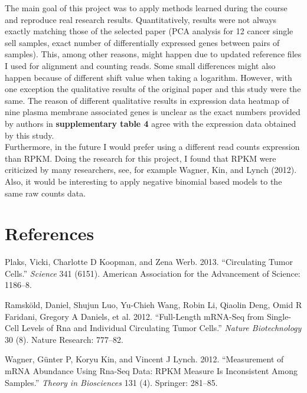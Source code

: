 \documentclass[]{article}
\begin{document}
The main goal of this project was to apply methods learned during the
course and reproduce real research results. Quantitatively, results were
not always exactly matching those of the selected paper (PCA analysis
for 12 cancer single sell samples, exact number of differentially
expressed genes between pairs of samples). This, among other reasons,
might happen due to updated reference files I used for alignment and
counting reads. Some small differences might also happen because of
different shift value when taking a logarithm. However, with one
exception the qualitative results of the original paper and this study
were the same. The reason of different qualitative results in expression
data heatmap of nine plasma membrane associated genes is unclear as the
exact numbers provided by authors in \textbf{supplementary table 4}
agree with the expression data obtained by this study.\\
Furthermore, in the future I would prefer using a different read counts
expression than RPKM. Doing the research for this project, I found that
RPKM were criticized by many researchers, see, for example Wagner, Kin,
and Lynch (2012). Also, it would be interesting to apply negative
binomial based models to the same raw counts data.

\section*{References}\label{references}

\hypertarget{refs}{}
\hypertarget{ref-plaks2013circulating}{}
Plaks, Vicki, Charlotte D Koopman, and Zena Werb. 2013. ``Circulating
Tumor Cells.'' \emph{Science} 341 (6151). American Association for the
Advancement of Science: 1186--8.

\hypertarget{ref-ramskold2012full}{}
Ramsköld, Daniel, Shujun Luo, Yu-Chieh Wang, Robin Li, Qiaolin Deng,
Omid R Faridani, Gregory A Daniels, et al. 2012. ``Full-Length mRNA-Seq
from Single-Cell Levels of Rna and Individual Circulating Tumor Cells.''
\emph{Nature Biotechnology} 30 (8). Nature Research: 777--82.

\hypertarget{ref-wagner2012measurement}{}
Wagner, Günter P, Koryu Kin, and Vincent J Lynch. 2012. ``Measurement of
mRNA Abundance Using Rna-Seq Data: RPKM Measure Is Inconsistent Among
Samples.'' \emph{Theory in Biosciences} 131 (4). Springer: 281--85.
\end{document}
